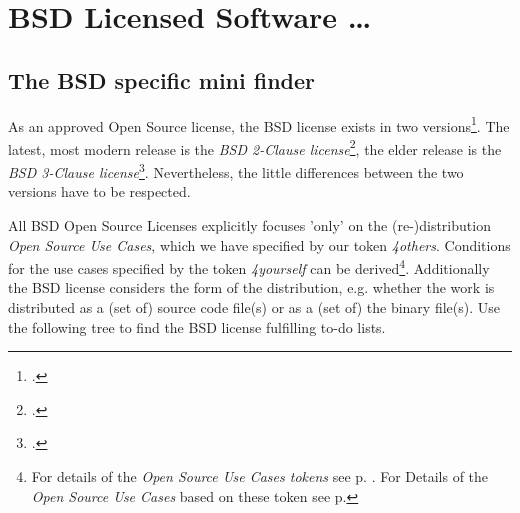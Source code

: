 %
%
%
%
%



\section{BSD Licensed Software \ldots}

\subsection{The BSD specific mini finder}

As an approved Open Source license, the BSD license exists in two
versions\footcite[Following the Open Source Initiative, initially a not approved
BSD license contained a fourth clause also known as advertising clause which
\enquote{(\ldots) officially was rescinded by the Director of the Office of
Technology Licensing of the University of California on July 22nd, 1999}.
 Cf.][\nopage wp. Because of the cancellation you can simply act according the
 \textit{BSD 3-Clause license} if you have to fulfill the eldest BSD
 license]{BsdLicense3Clause}. The latest, most modern release is the \textit{BSD
 2-Clause license}\footcite[cf.][\nopage wp]{BsdLicense2Clause}, the elder
 release is the \textit{BSD 3-Clause license}\footcite[cf.][\nopage
 wp]{BsdLicense3Clause}. Nevertheless, the little differences between the
 two versions have to be respected.

All BSD Open Source Licenses explicitly focuses 'only' on the (re-)distribution
\textit{Open Source Use Cases}, which we have specified by our token
\textit{4others}. Conditions for the use cases specified by the token
\textit{4yourself} can be derived\footnote{For details of the \textit{Open
Source Use Cases tokens} see p. \pageref{OsucTokens}. For Details of the
\textit{Open Source Use Cases} based on these token see p.
\pageref{OsucDefinitionTree} }. Additionally the BSD license considers the form
of the distribution, e.g. whether the work is distributed as a (set of) source
code file(s) or as a (set of) the binary file(s). Use the following tree to find
the BSD license fulfilling to-do lists.


